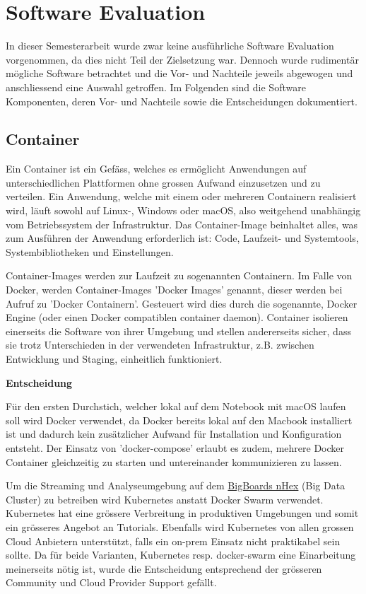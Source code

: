 \chapter{Software Evaluation}
\label{chap:data_collection}

In dieser Semesterarbeit wurde zwar keine ausf{\"u}hrliche Software Evaluation vorgenommen, da dies nicht Teil der Zielsetzung war. Dennoch wurde rudiment{\"a}r m{\"o}gliche Software betrachtet und die Vor- und Nachteile jeweils abgewogen und anschliessend eine Auswahl getroffen. Im Folgenden sind die Software Komponenten, deren Vor- und Nachteile sowie die Entscheidungen dokumentiert.

\section{Container}
\label{sec:container}

Ein Container ist ein Gef{\"a}ss, welches es erm{\"o}glicht Anwendungen auf unterschiedlichen Plattformen ohne grossen Aufwand einzusetzen und zu verteilen. Ein Anwendung, welche mit einem oder mehreren Containern realisiert wird, l{\"a}uft sowohl auf Linux-, Windows oder macOS, also weitgehend unabh{\"a}ngig vom Betriebssystem der Infrastruktur. Das Container-Image beinhaltet alles, was zum Ausf{\"u}hren der Anwendung erforderlich ist: Code, Laufzeit- und Systemtools, Systembibliotheken und Einstellungen.

Container-Images werden zur Laufzeit zu sogenannten Containern. Im Falle von Docker, werden Container-Images 'Docker Images' genannt, dieser werden bei Aufruf zu 'Docker Containern'. Gesteuert wird dies durch die sogenannte,  Docker Engine (oder einen Docker compatiblen container daemon). Container isolieren einerseits die Software von ihrer Umgebung und stellen andererseits sicher, dass sie trotz Unterschieden in der verwendeten Infrastruktur, z.B. zwischen Entwicklung und Staging, einheitlich funktioniert.

\textbf{Entscheidung}

F{\"u}r den ersten Durchstich, welcher lokal auf dem Notebook mit macOS laufen soll wird Docker verwendet, da Docker bereits lokal auf den Macbook installiert ist und dadurch kein zus{\"a}tzlicher Aufwand f{\"u}r Installation und Konfiguration entsteht. Der Einsatz von 'docker-compose' erlaubt es zudem, mehrere Docker Container gleichzeitig zu starten und untereinander kommunizieren zu lassen.

Um die Streaming und Analyseumgebung auf dem \href{http://bigboards.io/orderprototype/}{BigBoards nHex} (Big Data Cluster) zu betreiben wird Kubernetes anstatt Docker Swarm verwendet. Kubernetes hat eine gr{\"o}ssere Verbreitung in produktiven Umgebungen und somit ein gr{\"o}sseres Angebot an Tutorials. Ebenfalls wird Kubernetes von allen grossen Cloud Anbietern unterst{\"u}tzt, falls ein on-prem Einsatz nicht praktikabel sein sollte. Da f{\"u}r beide Varianten, Kubernetes resp. docker-swarm eine Einarbeitung meinerseits n{\"o}tig ist, wurde die Entscheidung entsprechend der gr{\"o}sseren Community und Cloud Provider Support gef{\"a}llt.

